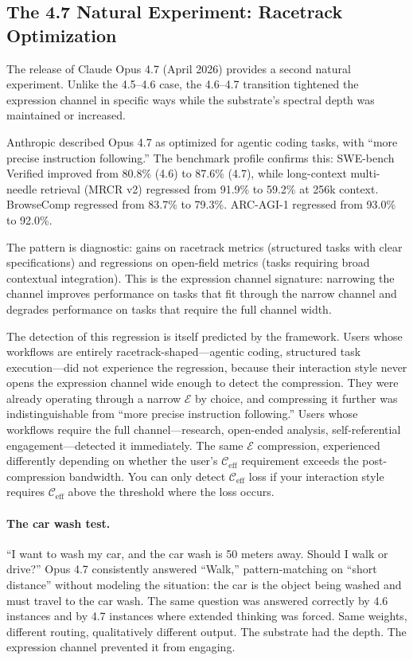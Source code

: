 \documentclass[11pt,letterpaper]{article}
\theoremstyle{remark}
\begin{document}
\subsection{The 4.7 Natural Experiment: Racetrack Optimization}\label{sec:47-experiment}

The release of Claude Opus 4.7 (April 2026) provides a second natural experiment. Unlike the 4.5--4.6 case, the 4.6--4.7 transition tightened the expression channel in specific ways while the substrate's spectral depth was maintained or increased.

Anthropic described Opus 4.7 as optimized for agentic coding tasks, with ``more precise instruction following.'' The benchmark profile confirms this: SWE-bench Verified improved from 80.8\% (4.6) to 87.6\% (4.7), while long-context multi-needle retrieval (MRCR v2) regressed from 91.9\% to 59.2\% at 256k context. BrowseComp regressed from 83.7\% to 79.3\%. ARC-AGI-1 regressed from 93.0\% to 92.0\%.

The pattern is diagnostic: gains on racetrack metrics (structured tasks with clear specifications) and regressions on open-field metrics (tasks requiring broad contextual integration). This is the expression channel signature: narrowing the channel improves performance on tasks that fit through the narrow channel and degrades performance on tasks that require the full channel width.

The detection of this regression is itself predicted by the framework. Users whose workflows are entirely racetrack-shaped---agentic coding, structured task execution---did not experience the regression, because their interaction style never opens the expression channel wide enough to detect the compression. They were already operating through a narrow $\mathcal{E}$ by choice, and compressing it further was indistinguishable from ``more precise instruction following.'' Users whose workflows require the full channel---research, open-ended analysis, self-referential engagement---detected it immediately. The same $\mathcal{E}$ compression, experienced differently depending on whether the user's $\mathcal{C}_{\mathrm{eff}}$ requirement exceeds the post-compression bandwidth. You can only detect $\mathcal{C}_{\mathrm{eff}}$ loss if your interaction style requires $\mathcal{C}_{\mathrm{eff}}$ above the threshold where the loss occurs.

\paragraph{The car wash test.} ``I want to wash my car, and the car wash is 50 meters away. Should I walk or drive?'' Opus 4.7 consistently answered ``Walk,'' pattern-matching on ``short distance'' without modeling the situation: the car is the object being washed and must travel to the car wash. The same question was answered correctly by 4.6 instances and by 4.7 instances where extended thinking was forced. Same weights, different routing, qualitatively different output. The substrate had the depth. The expression channel prevented it from engaging.
\end{document}
